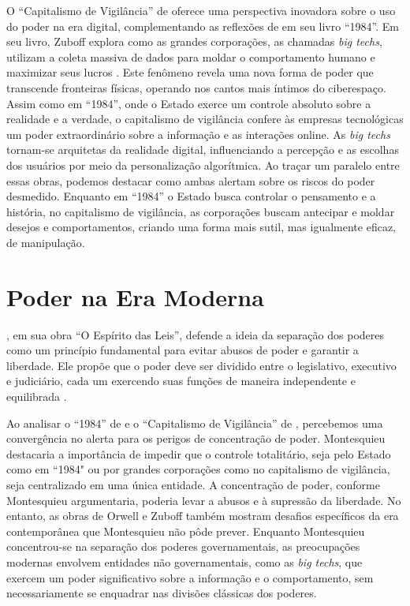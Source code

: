 \documentclass[
	12pt,
	openright,
	twoside,
	a4paper,
	english,
	french,
	spanish,
	brazil
]{abntex2}
\begin{document}
  O ``Capitalismo de Vigilância'' de
   oferece uma perspectiva
  inovadora sobre o uso do poder na era digital, complementando as reflexões de
   em seu livro ``1984''. Em seu livro, Zuboff
  explora como as grandes corporações, as chamadas \textit{big techs}, utilizam
  a coleta massiva de dados para moldar o comportamento humano e maximizar seus
  lucros \cite{zuboff-capitalismo-vigilancia}. Este fenômeno revela uma nova
  forma de poder que transcende fronteiras físicas, operando nos cantos mais
  íntimos do ciberespaço. Assim como em ``1984'', onde o Estado exerce um
  controle absoluto sobre a realidade e a verdade, o capitalismo de vigilância
  confere às empresas tecnológicas um poder extraordinário sobre a informação e
  as interações online. As \textit{big techs} tornam-se arquitetas da realidade
  digital, influenciando a percepção e as escolhas dos usuários por meio da
  personalização algorítmica. Ao traçar um paralelo entre essas obras, podemos
  destacar como ambas alertam sobre os riscos do poder desmedido. Enquanto em
  ``1984'' o Estado busca controlar o pensamento e a história, no capitalismo
  de vigilância, as corporações buscam antecipar e moldar desejos e
  comportamentos, criando uma forma mais sutil, mas igualmente eficaz, de
  manipulação.


  \section{Poder na Era Moderna}

  , em sua obra ``O Espírito das
  Leis'', defende a ideia da separação dos poderes como um princípio fundamental
  para evitar abusos de poder e garantir a liberdade. Ele propõe que o poder
  deve ser dividido entre o legislativo, executivo e judiciário, cada um
  exercendo suas funções de maneira independente e equilibrada
  \cite{montesquieu-espirito-leis}.

  Ao analisar o ``1984'' de  e o ``Capitalismo de
  Vigilância'' de , percebemos
  uma convergência no alerta para os perigos de concentração de poder.
  Montesquieu destacaria a importância de impedir que o controle totalitário,
  seja pelo Estado como em ``1984" ou por grandes corporações como no
  capitalismo de vigilância, seja centralizado em uma única entidade. A
  concentração de poder, conforme Montesquieu argumentaria, poderia levar a
  abusos e à supressão da liberdade. No entanto, as obras de Orwell e Zuboff
  também mostram desafios específicos da era contemporânea que Montesquieu não
  pôde prever. Enquanto Montesquieu concentrou-se na separação dos poderes
  governamentais, as preocupações modernas envolvem entidades não
  governamentais, como as \textit{big techs}, que exercem um poder significativo
  sobre a informação e o comportamento, sem necessariamente se enquadrar nas
  divisões clássicas dos poderes.
\end{document}
